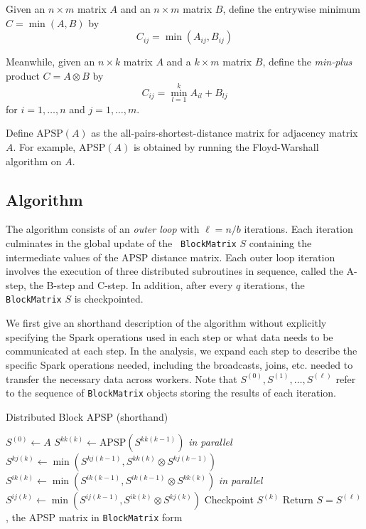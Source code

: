 \documentclass{article} %
\begin{document}
Given an $n \times m$ matrix $A$ and an $n \times m$ matrix $B$, define the entrywise minimum $C = \min(A, B)$ by
\[
C_{ij} = \min(A_{ij}, B_{ij})
\]

Meanwhile, given an $n \times k$ matrix $A$ and a $k \times m$ matrix $B$, define
the \emph{min-plus} product $C = A \otimes B$ by
\[
C_{ij} = \min_{l = 1}^k A_{il} + B_{lj}
\]
for $i = 1,\hdots, n$ and $j = 1,\hdots, m$.

Define $\text{APSP}(A)$ as the all-pairs-shortest-distance matrix for
adjacency matrix $A$.  For example, $\text{APSP}(A)$ is obtained by
running the Floyd-Warshall algorithm on $A$.

\subsection{Algorithm}

The algorithm consists of an \emph{outer loop} with $\ell = n/b$ iterations.
Each iteration culminates in the global update of the {\tt
  BlockMatrix} $S$ containing the intermediate values of the APSP
distance matrix.  Each outer loop iteration involves the execution of
three distributed subroutines in sequence, called the A-step, the
B-step and C-step.  In addition, after every $q$ iterations, the {\tt
  BlockMatrix} $S$ is checkpointed.

We first give an shorthand description of the algorithm without
explicitly specifying the Spark operations used in each step or what
data needs to be communicated at each step.  In the analysis, we
expand each step to describe the specific Spark operations needed,
including the broadcasts, joins, etc. needed to transfer the necessary
data across workers.  Note that $S^{(0)}, S^{(1)},\hdots,
S^{(\ell)}$ refer to the sequence of {\tt BlockMatrix} objects storing
the results of each iteration.

\begin{algorithm}[H]
\caption{Distributed Block APSP (shorthand)}
\begin{algorithmic}
  \State $S^{(0)} \leftarrow A$
    \State [A-step]
    \State $S^{kk(k)} \leftarrow \text{APSP}(S^{kk(k-1)})$
    \State [B-step]
     \emph{in parallel}
        \State $S^{kj(k)} \leftarrow \min(S^{kj(k-1)}, S^{kk(k)} \otimes S^{kj(k-1)})$ 
      \EndIf
        \State $S^{ik(k)} \leftarrow \min(S^{ik(k-1)}, S^{ik(k-1)} \otimes S^{kk(k)})$
      \EndIf
    \EndFor
    \State [C-step]
     \emph{in parallel}
        \State $S^{ij(k)} \leftarrow \min(S^{ij(k-1)}, S^{ik(k)} \otimes S^{kj(k)})$
      \EndIf
    \EndFor
    \State [D-step]
      \State Checkpoint $S^{(k)}$
    \EndIf
  \EndFor
  \State Return $S = S^{(\ell)}$, the APSP matrix in {\tt BlockMatrix} form
\EndFunction
\end{algorithmic}
\end{algorithm}
\end{document}
